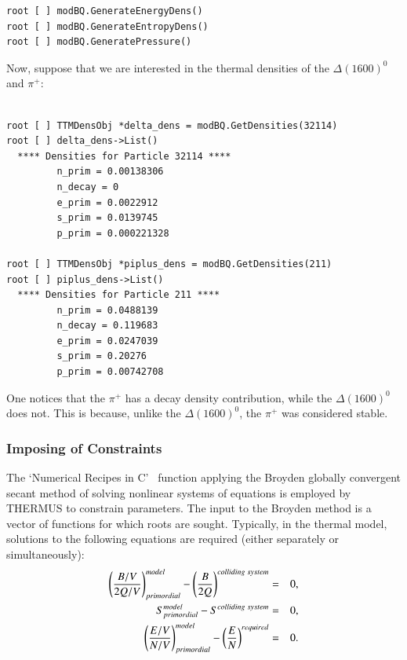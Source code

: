 \documentclass{elsarticle}
\begin{document}
\small
\begin{verbatim}
root [ ] modBQ.GenerateEnergyDens()
root [ ] modBQ.GenerateEntropyDens()
root [ ] modBQ.GeneratePressure()
\end{verbatim}
\normalsize

\noindent
Now, suppose that we are interested in the thermal densities of the 
$\Delta(1600)^0$ and $\pi^+$:

\small
\begin{verbatim}

root [ ] TTMDensObj *delta_dens = modBQ.GetDensities(32114)
root [ ] delta_dens->List()
  **** Densities for Particle 32114 ****
         n_prim = 0.00138306
         n_decay = 0
         e_prim = 0.0022912
         s_prim = 0.0139745
         p_prim = 0.000221328

root [ ] TTMDensObj *piplus_dens = modBQ.GetDensities(211)
root [ ] piplus_dens->List()
  **** Densities for Particle 211 ****
         n_prim = 0.0488139
         n_decay = 0.119683
         e_prim = 0.0247039
         s_prim = 0.20276
         p_prim = 0.00742708

\end{verbatim}
\normalsize

\noindent
One notices that the $\pi^+$ has a decay density contribution, while the $\Delta(1600)^0$ does not. 
This is because, unlike the $\Delta(1600)^0$, the $\pi^+$ was considered stable.\\

\subsubsection{Imposing of Constraints}

The `Numerical Recipes in C'~\cite{press:2007nrc} function applying the Broyden globally
convergent secant method of solving nonlinear systems of equations is
employed by THERMUS to constrain parameters. The input to the Broyden 
method is a vector of functions for which roots are sought. Typically, 
in the thermal model, solutions to the following equations 
are required (either separately or simultaneously):\\  
\begin{eqnarray*}
\left({B/V \over 2Q/V}\right)_{primordial}^{model} - \left({B \over 2Q}\right)^{colliding\;system} &=& 0,\\
S_{primordial}^{model} - S^{colliding\;system} &=& 0,\\
\left({E/V \over N/V}\right)_{primordial}^{model} - \left(E \over N\right)^{required} &=& 0.
\end{eqnarray*}
\end{document}
